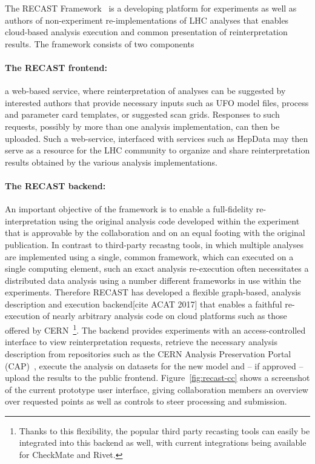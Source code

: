 The RECAST Framework~\cite{Cranmer2011} is a developing platform for experiments as well as authors of non-experiment re-implementations of LHC analyses that enables cloud-based analysis execution and common presentation of reinterpretation results. The framework consists of two components

\paragraph{The RECAST frontend:} a web-based service, where reinterpretation of analyses can be suggested by interested authors that provide necessary inputs such as UFO model files, process and parameter card templates, or suggested scan grids. Responses to such requests, possibly by more than one analysis implementation, can then be uploaded. Such a web-service, interfaced with services such as HepData may then serve as a resource for the LHC community to organize and share reinterpretation results obtained by the various analysis implementations.

\paragraph{The RECAST backend:} An important objective of the framework is to enable a full-fidelity re-interpretation using the original analysis code developed within the experiment that is approvable by the collaboration and on an equal footing with the original publication. In contrast to third-party recastng tools, in which multiple analyses are implemented using a single, common framework, which can executed on a single computing element, such an exact analysis re-execution often necessitates a distributed data analysis using a number different frameworks in use within the experiments. Therefore RECAST has developed a flexible graph-based, analysis description and execution backend[cite ACAT 2017] that enables a faithful re-execution of nearly arbitrary analysis code on cloud platforms such as those offered by CERN~\footnote{Thanks to this flexibility, the popular third party recasting tools can easily be integrated into this backend as well, with current integrations being available for CheckMate and Rivet.}. The backend provides experiments with an access-controlled interface to view reinterpretation requests, retrieve the necessary analysis description from repositories such as the CERN Analysis Preservation Portal (CAP)~\cite{CAP},  execute the analysis on datasets for the new model and -- if approved -- upload the results to the public frontend. Figure~\ref{fig:recast-cc} shows a screenshot of the current prototype user interface, giving collaboration members an overview over requested points as well as controls to steer processing and submission.

